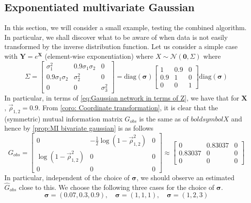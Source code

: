 \documentclass[../Thesis.tex]{subfiles}
\begin{document}
\subsection{Exponentiated multivariate Gaussian}\label{ex:1}
In this section, we will consider a small example, testing the combined algorithm. In particular, we shall discover what to be aware of when data is not easily transformed by the inverse distribution function. Let us consider a simple case with $\mathbf{Y} = e^{\mathbf{X}}$ (element-wise exponentiation) where $X \sim \mathcal{N}\left(\mathbf{0}, \Sigma\right)$ where
\begin{equation}\label{eq:Results - 3x3 example - Sigma structure}
    \Sigma = \begin{bmatrix}
        \sigma_1^2           & 0.9\sigma_1\sigma_2 & 0          \\
        0.9 \sigma_1\sigma_2 & \sigma_2^2          & 0          \\
        0                    & 0                   & \sigma_3^2
    \end{bmatrix} = \text{diag}\left(\boldsymbol \sigma \right) \begin{bmatrix}
        1   & 0.9 & 0 \\
        0.9 & 1   & 0 \\
        0   & 0   & 1
    \end{bmatrix} \text{diag}\left(\boldsymbol \sigma \right)
\end{equation}
In particular, in terms of \autoref{eq:Gaussian network in terms of Z}, we have that for $\boldsymbol X$, $\vec{\rho}_{1,2} = 0.9$. From \autoref{coro: Coordinate transformation}, it is clear that the (symmetric) mutual information matrix $G_{obs}$ is the same as of $boldsymbol X$ and hence by \autoref{prop:MI bivariate gaussian} is as follows
$$G_{obs} = \begin{bmatrix}
        0                                        & -\frac{1}{2} \log \left(1 - \vec{\rho}_{1,2}^2\right) & 0 \\
        \log \left(1 - \vec{\rho}_{1,2}^2\right) & 0                                                     & 0 \\
        0                                        & 0                                                     & 0
    \end{bmatrix} \approx \begin{bmatrix}
        0       & 0.83037 & 0 \\
        0.83037 & 0       & 0 \\
        0       & 0       & 0
    \end{bmatrix}$$
In particular, independent of the choice of $\boldsymbol \sigma$, we should observe an estimated $\hat{G}_{obs}$ close to this. We choose the following three cases for the choice of $\boldsymbol \sigma$.
$$
    \boldsymbol\sigma = (0.07, 0.3, 0.9), \quad
    \boldsymbol\sigma = (1,1,1), \quad
    \boldsymbol\sigma = (1,2,3)
$$
\end{document}
